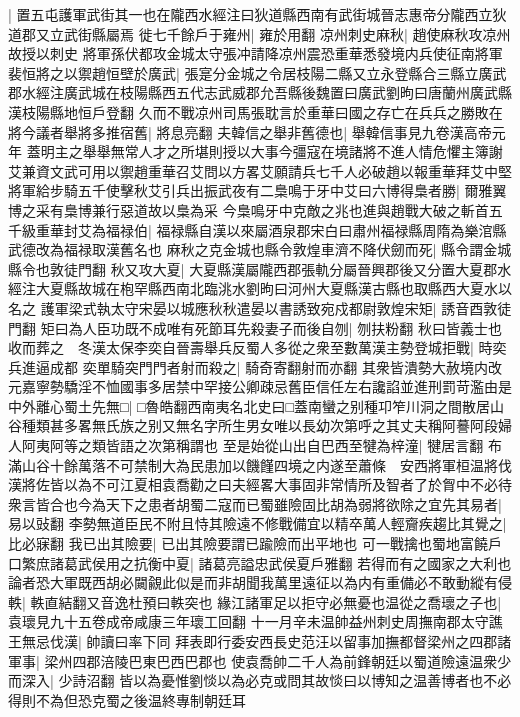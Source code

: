 |{
	置五屯護軍武街其一也在隴西水經注曰狄道縣西南有武街城晉志惠帝分隴西立狄道郡又立武街縣屬焉}
徙七千餘戶于雍州|{
	雍於用翻}
凉州刺史麻秋|{
	趙使麻秋攻凉州故授以刺史}
將軍孫伏都攻金城太守張冲請降凉州震恐重華悉發境内兵使征南將軍裴恒將之以禦趙恒壁於廣武|{
	張寔分金城之令居枝陽二縣又立永登縣合三縣立廣武郡水經注廣武城在枝陽縣西五代志武威郡允吾縣後魏置曰廣武劉昫曰唐蘭州廣武縣漢枝陽縣地恒戶登翻}
久而不戰凉州司馬張耽言於重華曰國之存亡在兵兵之勝敗在將今議者舉將多推宿舊|{
	將息亮翻}
夫韓信之舉非舊德也|{
	舉韓信事見九卷漢高帝元年}
蓋明主之舉舉無常人才之所堪則授以大事今彊寇在境諸將不進人情危懼主簿謝艾兼資文武可用以禦趙重華召艾問以方畧艾願請兵七千人必破趙以報重華拜艾中堅將軍給步騎五千使擊秋艾引兵出振武夜有二梟鳴于牙中艾曰六博得梟者勝|{
	爾雅翼博之采有梟博兼行惡道故以梟為采}
今梟鳴牙中克敵之兆也進與趙戰大破之斬首五千級重華封艾為福禄伯|{
	福禄縣自漢以來屬酒泉郡宋白曰肅州福禄縣周隋為樂涫縣武德改為福禄取漢舊名也}
麻秋之克金城也縣令敦煌車濟不降伏劒而死|{
	縣令謂金城縣令也敦徒門翻}
秋又攻大夏|{
	大夏縣漢屬隴西郡張軌分屬晉興郡後又分置大夏郡水經注大夏縣故城在枹罕縣西南北臨洮水劉昫曰河州大夏縣漢古縣也取縣西大夏水以名之}
護軍梁式執太守宋晏以城應秋秋遣晏以書誘致宛戍都尉敦煌宋矩|{
	誘音酉敦徒門翻}
矩曰為人臣功既不成唯有死節耳先殺妻子而後自刎|{
	刎扶粉翻}
秋曰皆義士也收而葬之　冬漢太保李奕自晉壽舉兵反蜀人多從之衆至數萬漢主勢登城拒戰|{
	時奕兵進逼成都}
奕單騎突門門者射而殺之|{
	騎奇寄翻射而亦翻}
其衆皆潰勢大赦境内改元嘉寧勢驕淫不恤國事多居禁中罕接公卿疎忌舊臣信任左右讒諂並進刑罰苛濫由是中外離心蜀土先無□|{
	□魯皓翻西南夷名北史曰□蓋南蠻之别種卭笮川洞之間散居山谷種類甚多畧無氏族之别又無名字所生男女唯以長幼次第呼之其丈夫稱阿謩阿段婦人阿夷阿等之類皆語之次第稱謂也}
至是始從山出自巴西至犍為梓潼|{
	犍居言翻}
布滿山谷十餘萬落不可禁制大為民患加以饑饉四境之内遂至蕭條　安西將軍桓温將伐漢將佐皆以為不可江夏相袁喬勸之曰夫經畧大事固非常情所及智者了於胷中不必待衆言皆合也今為天下之患者胡蜀二寇而已蜀雖險固比胡為弱將欲除之宜先其易者|{
	易以䜴翻}
李勢無道臣民不附且恃其險遠不修戰備宜以精卒萬人輕齎疾趨比其覺之|{
	比必寐翻}
我已出其險要|{
	已出其險要謂已踰險而出平地也}
可一戰擒也蜀地富饒戶口繁庶諸葛武侯用之抗衡中夏|{
	諸葛亮謚忠武侯夏戶雅翻}
若得而有之國家之大利也論者恐大軍既西胡必闚覦此似是而非胡聞我萬里遠征以為内有重備必不敢動縱有侵軼|{
	軼直結翻又音逸杜預曰軼突也}
緣江諸軍足以拒守必無憂也温從之喬瓌之子也|{
	袁瓌見九十五卷成帝咸康三年瓌工回翻}
十一月辛未温帥益州刺史周撫南郡太守譙王無忌伐漢|{
	帥讀曰率下同}
拜表即行委安西長史范汪以留事加撫都督梁州之四郡諸軍事|{
	梁州四郡涪陵巴東巴西巴郡也}
使袁喬帥二千人為前鋒朝廷以蜀道險遠温衆少而深入|{
	少詩沼翻}
皆以為憂惟劉惔以為必克或問其故惔曰以博知之温善博者也不必得則不為但恐克蜀之後温終專制朝廷耳

